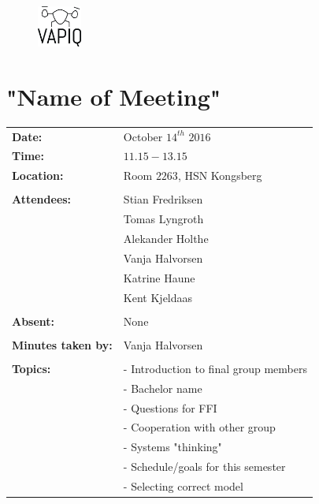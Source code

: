 \documentclass{article}
\begin{document}
\begin{figure}
\begin{center}
\includegraphics[width=0.13\textwidth]{VAPIQ-PICTURES/Logo2_Tilted.png} %
\advance{}
\end{center}
\end{figure}


\section*{"Name of Meeting"}   %
\begin{tabular}{ll}            
\textbf{Date:} 	            & October $14^{th}$ $2016$	    \\
\textbf{Time:}	        	& $11.15-13.15$				    \\
\textbf{Location:}       	& Room $2263$, HSN Kongsberg    \\\\
\textbf{Attendees:}         & Stian Fredriksen			    \\
				        	& Tomas Lyngroth			    \\  
				        	& Alekander Holthe 		    	\\
				        	& Vanja Halvorsen		    	\\
				        	& Katrine Haune 		    	\\
				        	& Kent Kjeldaas                 \\\\
\textbf{Absent:}		    & None 						    \\\\
\textbf{Minutes taken by:}	& Vanja Halvorsen		        \\\\

\textbf{Topics:}	        & - Introduction to final group members \\ 
                            & - Bachelor name 			            \\
				        	& - Questions for FFI                   \\  
				        	& - Cooperation with other group        \\
				        	& - Systems "thinking"	    	        \\
				        	& - Schedule/goals for this semester    \\
				        	& - Selecting correct model             \\
\end{tabular}                                                       \\\\\\
\end{document}
